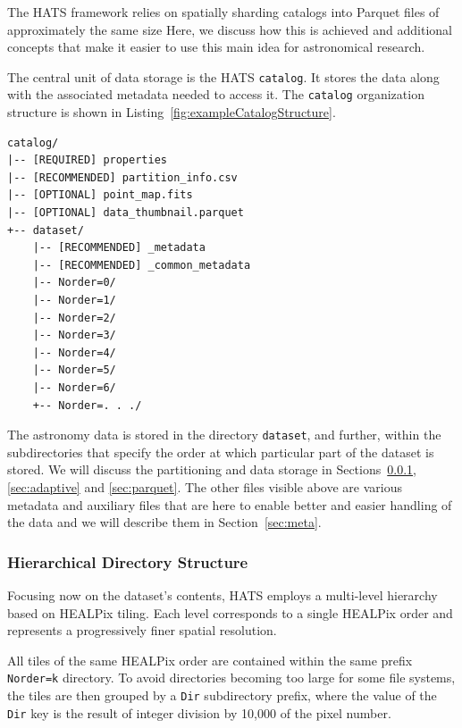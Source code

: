 \documentclass[11pt,a4paper]{ivoa}
\begin{document}
The HATS framework relies on spatially sharding catalogs into Parquet files of approximately the same size 
Here, we discuss how this is achieved and additional concepts that make it easier to use this main idea for astronomical research.

The central unit of data storage is the HATS \texttt{catalog}. 
It stores the data along with the associated metadata needed to access it. 
The  \texttt{catalog} organization structure is shown in Listing~\ref{fig:exampleCatalogStructure}.

\begin{minipage}{\linewidth}
\begin{lstlisting}[caption=Example catalog directory contents, label=fig:exampleCatalogStructure]
catalog/
|-- [REQUIRED] properties
|-- [RECOMMENDED] partition_info.csv
|-- [OPTIONAL] point_map.fits
|-- [OPTIONAL] data_thumbnail.parquet
+-- dataset/
    |-- [RECOMMENDED] _metadata
    |-- [RECOMMENDED] _common_metadata
    |-- Norder=0/
    |-- Norder=1/
    |-- Norder=2/
    |-- Norder=3/
    |-- Norder=4/
    |-- Norder=5/
    |-- Norder=6/
    +-- Norder=. . ./
\end{lstlisting}
\end{minipage}

The astronomy data is stored in the directory \texttt{dataset}, and further, within the subdirectories that specify the order at which particular part of the dataset is stored. 
We will discuss the partitioning and data storage in Sections~\ref{sec:hierarchical}, \ref{sec:adaptive} and \ref{sec:parquet}. 
The other files visible above are various metadata and auxiliary files that are here to enable better and easier handling of the data and we will describe them in Section~\ref{sec:meta}. 
    
\subsubsection{Hierarchical Directory Structure} \label{sec:hierarchical}
Focusing now on the dataset's contents, HATS employs a multi-level hierarchy based on HEALPix tiling.
Each level corresponds to a single HEALPix order and represents a progressively finer spatial resolution.

All tiles of the same HEALPix order are contained within the same prefix \texttt{Norder=k} directory. 
To avoid directories becoming too large for some file systems, the tiles are then grouped by a \texttt{Dir} subdirectory prefix,
where the value of the \texttt{Dir} key is the result of integer division by 10,000 of the pixel number.
\end{document}

